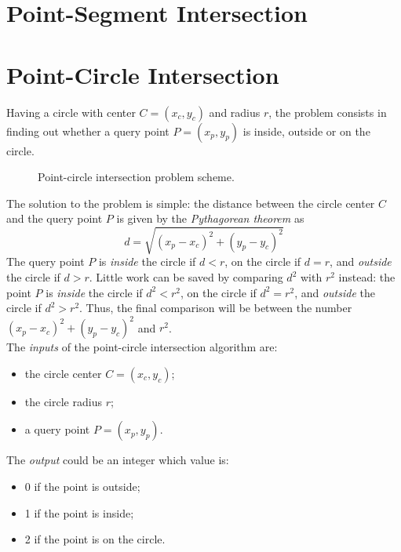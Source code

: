 \section{Point-Segment Intersection}

%
\section{Point-Circle Intersection}
Having a circle with center $C = (x_c, y_c)$ and radius $r$, the problem consists in finding out whether a query point $P = (x_p, y_p)$ is inside, outside or on the circle.
%
\begin{figure}
	\centering
	\caption{Point-circle intersection problem scheme.}
\end{figure}
%
The solution to the problem is simple: the distance between the circle center $C$ and the query point $P$ is given by the \textit{Pythagorean theorem} as
\begin{equation}
	d=\sqrt{(x_p-x_c)^2 + (y_p-y_c)^2}
\end{equation}
The query point $P$ is \textit{inside} the circle if $d<r$, on the circle if $d = r$, and \textit{outside} the circle if $d > r$. Little work can be saved by comparing $d^2$ with $r^2$ instead: the point $P$ is \textit{inside} the circle if $d^2<r^2$, on the circle if $d^2 = r^2$, and \textit{outside} the circle if $d^2 > r^2$. Thus, the final comparison will be between the number $(x_p-x_c)^2 + (y_p-y_c)^2$ and $r^2$.\\
The \textit{inputs} of the point-circle intersection algorithm are:
\begin{itemize}
	\item the circle center $C = (x_c, y_c)$;
	\item the circle radius $r$;
	\item a query point $P=(x_p, y_p)$.
\end{itemize}
The \textit{output} could be an integer which value is:
\begin{itemize}
	\item 0 if the point is outside;
	\item 1 if the point is inside;
	\item 2 if the point is on the circle.
\end{itemize}
